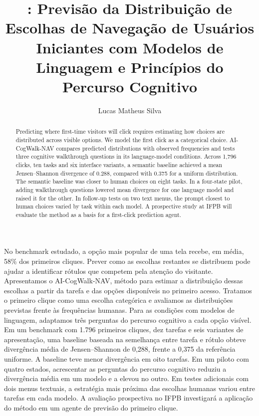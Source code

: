 \documentclass[12pt]{article}
\title{\proj: Previsão da Distribuição de Escolhas de Navegação de Usuários Iniciantes com Modelos de Linguagem e Princípios do Percurso Cognitivo}
\author{Lucas Matheus Silva\inst{1}}
\begin{document}
\maketitle\thispagestyle{plain}\raggedbottom
\sloppy

\begin{abstract}
Predicting where first-time visitors will click requires estimating how choices are distributed across visible options. We model the first click as a categorical choice. AI-CogWalk-NAV compares predicted distributions with observed frequencies and tests three cognitive walkthrough questions in its language-model conditions. Across 1,796 clicks, ten tasks and six interface variants, a semantic baseline achieved a mean Jensen--Shannon divergence of 0.288, compared with 0.375 for a uniform distribution. The semantic baseline was closer to human choices on eight tasks. In a four-state pilot, adding walkthrough questions lowered mean divergence for one language model and raised it for the other. In follow-up tests on two text menus, the prompt closest to human choices varied by task within each model. A prospective study at IFPB will evaluate the method as a basis for a first-click prediction agent.
\end{abstract}

\begin{resumo}
No benchmark estudado, a opção mais popular de uma tela recebe, em média, 58\% dos primeiros cliques. Prever como as escolhas restantes se distribuem pode ajudar a identificar rótulos que competem pela atenção do visitante. Apresentamos o AI-CogWalk-NAV, método para estimar a distribuição dessas escolhas a partir da tarefa e das opções disponíveis no primeiro acesso. Tratamos o primeiro clique como uma escolha categórica e avaliamos as distribuições previstas frente às frequências humanas. Para as condições com modelos de linguagem, adaptamos três perguntas do percurso cognitivo a cada opção visível. Em um benchmark com 1.796 primeiros cliques, dez tarefas e seis variantes de apresentação, uma baseline baseada na semelhança entre tarefa e rótulo obteve divergência média de Jensen–Shannon de 0,288, frente a 0,375 da referência uniforme. A baseline teve menor divergência em oito tarefas. Em um piloto com quatro estados, acrescentar as perguntas do percurso cognitivo reduziu a divergência média em um modelo e a elevou no outro. Em testes adicionais com dois menus textuais, a estratégia mais próxima das escolhas humanas variou entre tarefas em cada modelo. A avaliação prospectiva no IFPB investigará a aplicação do método em um agente de previsão do primeiro clique.
\end{resumo}
\end{document}
